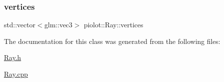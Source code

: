 \mbox{\label{classpiolot_1_1_ray_adb40c4fbcb029550c160a892842c40cc}} 
\subsubsection{\texorpdfstring{vertices}{vertices}}
{\footnotesize\ttfamily std\+::vector$<$glm\+::vec3$>$ piolot\+::\+Ray\+::vertices\hspace{0.3cm}{\ttfamily [private]}}



The documentation for this class was generated from the following files\+:\begin{DoxyCompactItemize}
\item 
\mbox{\hyperlink{_ray_8h}{Ray.\+h}}\item 
\mbox{\hyperlink{_ray_8cpp}{Ray.\+cpp}}\end{DoxyCompactItemize}
